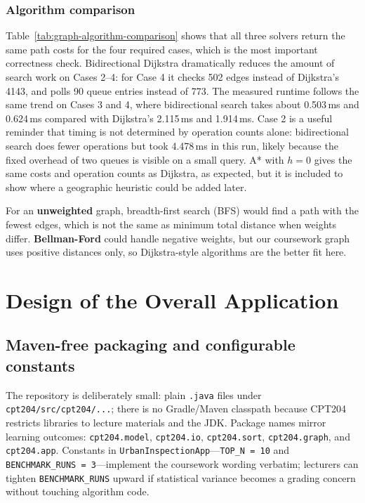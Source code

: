 \documentclass[12pt,a4paper,twocolumn,openany]{report}
\begin{document}
\subsection{Algorithm comparison}
Table~\ref{tab:graph-algorithm-comparison} shows that all three solvers return the same path costs for the four required cases, which is the most important correctness check. 
Bidirectional Dijkstra dramatically reduces the amount of search work on Cases 2--4: for Case 4 it checks 502 edges instead of Dijkstra's 4143, and polls 90 queue entries instead of 773. 
The measured runtime follows the same trend on Cases 3 and 4, where bidirectional search takes about 0.503\,ms and 0.624\,ms compared with Dijkstra's 2.115\,ms and 1.914\,ms. 
Case 2 is a useful reminder that timing is not determined by operation counts alone: bidirectional search does fewer operations but took 4.478\,ms in this run, likely because the fixed overhead of two queues is visible on a small query. 
A* with $h=0$ gives the same costs and operation counts as Dijkstra, as expected, but it is included to show where a geographic heuristic could be added later.

For an \textbf{unweighted} graph, breadth-first search (BFS) would find a path with the fewest edges, which is not the same as minimum total distance when weights differ. 
\textbf{Bellman-Ford} could handle negative weights, but our coursework graph uses positive distances only, so Dijkstra-style algorithms are the better fit here.

\chapter{Design of the Overall Application}

\section{Maven-free packaging and configurable constants}
The repository is deliberately small: plain \texttt{.java} files under \texttt{cpt204/src/cpt204/...}; there is no Gradle/Maven classpath because CPT204 restricts libraries to lecture materials and the JDK.
Package names mirror learning outcomes: \texttt{cpt204.model}, \texttt{cpt204.io}, \texttt{cpt204.sort}, \texttt{cpt204.graph}, and \texttt{cpt204.app}.
Constants in \texttt{UrbanInspectionApp}---\texttt{TOP\_N = 10} and \texttt{BENCHMARK\_RUNS = 3}---implement the coursework wording verbatim; lecturers can tighten \texttt{BENCHMARK\_RUNS} upward if statistical variance becomes a grading concern without touching algorithm code.
\end{document}
